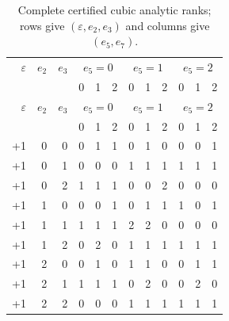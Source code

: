 {
\scriptsize
\setlength{\tabcolsep}{2pt}
\begin{longtable}{rrr|rrr|rrr|rrr}
\caption{Complete certified cubic analytic ranks; rows give $(\varepsilon,e_2,e_3)$ and columns give $(e_5,e_7)$.}\\
\toprule
$\varepsilon$&$e_2$&$e_3$&\multicolumn{3}{c}{$e_5=0$}&\multicolumn{3}{c}{$e_5=1$}&\multicolumn{3}{c}{$e_5=2$}\\
&&&0&1&2&0&1&2&0&1&2\\
\midrule
\endfirsthead
\toprule
$\varepsilon$&$e_2$&$e_3$&\multicolumn{3}{c}{$e_5=0$}&\multicolumn{3}{c}{$e_5=1$}&\multicolumn{3}{c}{$e_5=2$}\\
&&&0&1&2&0&1&2&0&1&2\\
\midrule
\endhead
\bottomrule\endfoot
+1&0&0&0&1&1&0&1&0&0&0&1\\
+1&0&1&0&0&0&1&1&1&1&1&1\\
+1&0&2&1&1&1&0&0&2&0&0&0\\
+1&1&0&0&0&1&0&1&1&1&0&1\\
+1&1&1&1&1&1&2&2&0&0&0&0\\
+1&1&2&0&2&0&1&1&1&1&1&1\\
+1&2&0&0&1&0&1&1&0&0&1&1\\
+1&2&1&1&1&1&0&2&0&0&2&0\\
+1&2&2&0&0&0&1&1&1&1&1&1\\
\end{longtable}
}
